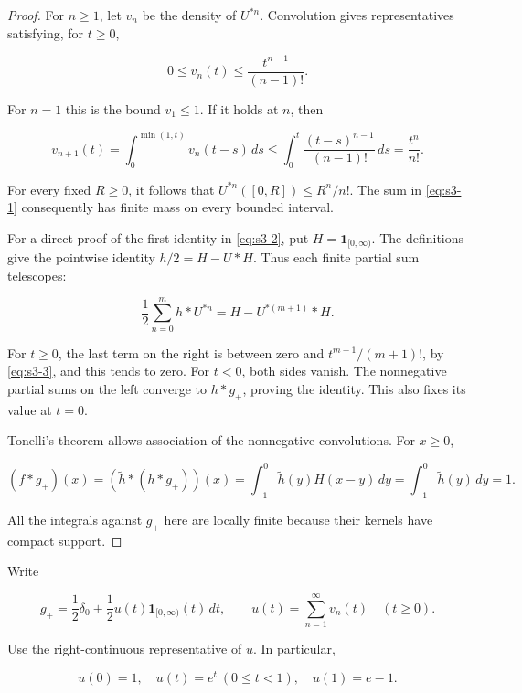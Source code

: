 \documentclass[10pt]{article}
\numberwithin{equation}{section}
\theoremstyle{remark}
\begin{document}
\begin{proof} For \(n\ge1\), let \(v_n\) be the density of \(U^{*n}\).
Convolution gives representatives satisfying, for \(t\ge0\),

\begin{equation}
0\le v_n(t)\le\frac{t^{n-1}}{(n-1)!}.
\label{eq:s3-3}
\end{equation}

For \(n=1\) this is the bound \(v_1\le1\). If it holds at \(n\), then

\[
v_{n+1}(t)=\int_0^{\min(1,t)}v_n(t-s)\,ds
\le\int_0^t\frac{(t-s)^{n-1}}{(n-1)!}\,ds
=\frac{t^n}{n!}.
\]

For every fixed \(R\ge0\), it follows that
\(U^{*n}([0,R])\le R^n/n!\). The sum in \eqref{eq:s3-1} consequently has finite mass
on every bounded interval.

For a direct proof of the first identity in \eqref{eq:s3-2}, put
\(H=\mathbf1_{[0,\infty)}\). The definitions give the pointwise identity
\(h/2=H-U*H\). Thus each finite partial sum telescopes:

\begin{equation}
\frac12\sum_{n=0}^m h*U^{*n}
=H-U^{*(m+1)}*H.
\label{eq:s3-4}
\end{equation}

For \(t\ge0\), the last term on the right is between zero and
\(t^{m+1}/(m+1)!\), by \eqref{eq:s3-3}, and this tends to zero. For \(t<0\), both
sides vanish. The nonnegative partial sums on the left converge to
\(h*g_+\), proving the identity. This also fixes its value at \(t=0\).

Tonelli's theorem allows association of the nonnegative convolutions.
For \(x\ge0\),

\[
(f*g_+)(x)
=(\widetilde h*(h*g_+))(x)
=\int_{-1}^0\widetilde h(y)H(x-y)\,dy
=\int_{-1}^0\widetilde h(y)\,dy=1.
\]

All the integrals against \(g_+\) here are locally finite because their
kernels have compact support. \end{proof}

Write

\begin{equation}
g_+=\frac12\delta_0+\frac12u(t)\mathbf1_{[0,\infty)}(t)\,dt,
\qquad u(t)=\sum_{n=1}^{\infty}v_n(t)\quad(t\ge0).
\label{eq:s3-5}
\end{equation}

Use the right-continuous representative of \(u\). In particular,

\begin{equation}
u(0)=1,\quad u(t)=e^t\ (0\le t<1),\quad u(1)=e-1.
\label{eq:s3-6}
\end{equation}
\end{document}
